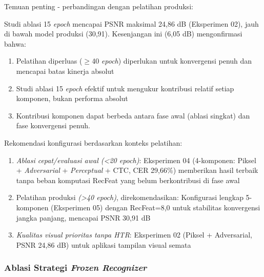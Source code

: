 \documentclass[12pt,a4paper]{article}
\begin{document}
Temuan penting - perbandingan dengan pelatihan produksi:

Studi ablasi 15 \textit{epoch} mencapai PSNR maksimal 24,86 dB (Eksperimen 02), jauh di bawah model produksi (30,91). Kesenjangan ini (6,05 dB) mengonfirmasi bahwa:
\begin{enumerate}[leftmargin=1.5em, labelsep=0.5em, itemindent=0pt, noitemsep, topsep=0pt, label=\alph*)]
    \item Pelatihan diperluas ($\geq$40 \textit{epoch}) diperlukan untuk konvergensi penuh dan mencapai batas kinerja absolut
    \item Studi ablasi 15 \textit{epoch} efektif untuk mengukur kontribusi relatif setiap komponen, bukan performa absolut
    \item Kontribusi komponen dapat berbeda antara fase awal (ablasi singkat) dan fase konvergensi penuh.
\end{enumerate}

Rekomendasi konfigurasi berdasarkan konteks pelatihan:
\begin{enumerate}[leftmargin=1.5em, labelsep=0.5em, itemindent=0pt, noitemsep, topsep=0pt, label=\alph*)]
    \item \textit{Ablasi cepat/evaluasi awal (<20 \textit{epoch})}: Eksperimen 04 (4-komponen: Piksel + \textit{Adversarial} + \textit{Perceptual} + CTC, CER 29,66\%) memberikan hasil terbaik tanpa beban komputasi RecFeat yang belum berkontribusi di fase awal
    \item Pelatihan produksi \textit{(>40 \textit{epoch})}, direkomendasikan: Konfigurasi lengkap 5-komponen (Eksperimen 05) dengan RecFeat=8,0 untuk stabilitas konvergensi jangka panjang, mencapai PSNR 30,91 dB
    \item \textit{Kualitas visual prioritas tanpa HTR}: Eksperimen 02 (Piksel + Adversarial, PSNR 24,86 dB) untuk aplikasi tampilan visual semata
\end{enumerate}


\subsubsection{Ablasi Strategi \textit{Frozen Recognizer}}
\label{subsubsec:kontribusi-frozen-recognizer}
\end{document}
